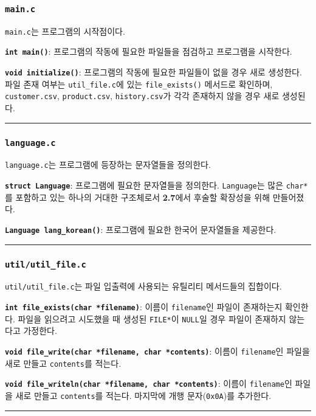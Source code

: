 \documentclass[runningheads]{llncs}
\begin{document}
\subsubsection{\texttt{main.c}}
\texttt{main.c}는 프로그램의 시작점이다.

\textbf{\texttt{int main()}}: 프로그램의 작동에 필요한 파일들을 점검하고 프로그램을 시작한다.

\textbf{\texttt{void initialize()}}: 프로그램의 작동에 필요한 파일들이 없을 경우 새로 생성한다. 파일 존재 여부는 \texttt{util_file.c}에 있는 \texttt{file_exists()} 메서드로 확인하며, \texttt{customer.csv}, \texttt{product.csv}, \texttt{history.csv}가 각각 존재하지 않을 경우 새로 생성된다.

\noindent\rule{2cm}{0.4pt}

\subsubsection{\texttt{language.c}}
\texttt{language.c}는 프로그램에 등장하는 문자열들을 정의한다.

\textbf{\texttt{struct Language}}: 프로그램에 필요한 문자열들을 정의한다. \texttt{Language}는 많은 \texttt{char*}를 포함하고 있는 하나의 거대한 구조체로서 \textbf{2.7}에서 후술할 확장성을 위해 만들어졌다.  

\textbf{\texttt{Language lang_korean()}}: 프로그램에 필요한 한국어 문자열들을 제공한다.

\noindent\rule{2cm}{0.4pt}

\subsubsection{\texttt{util/util_file.c}}
\texttt{util/util_file.c}는 파일 입출력에 사용되는 유틸리티 메서드들의 집합이다.

\textbf{\texttt{int file_exists(char *filename)}}: 이름이 \texttt{filename}인 파일이 존재하는지 확인한다. 파일을 읽으려고 시도했을 때 생성된 \texttt{FILE*}이 \texttt{NULL}일 경우 파일이 존재하지 않는다고 가정한다.

\textbf{\texttt{void file_write(char *filename, char *contents)}}: 이름이 \texttt{filename}인 파일을 새로 만들고 \texttt{contents}를 적는다.

\textbf{\texttt{void file_writeln(char *filename, char *contents)}}: 이름이 \texttt{filename}인 파일을 새로 만들고 \texttt{contents}를 적는다. 마지막에 개행 문자(\texttt{0x0A})를 추가한다.

\noindent\rule{2cm}{0.4pt}
\end{document}
